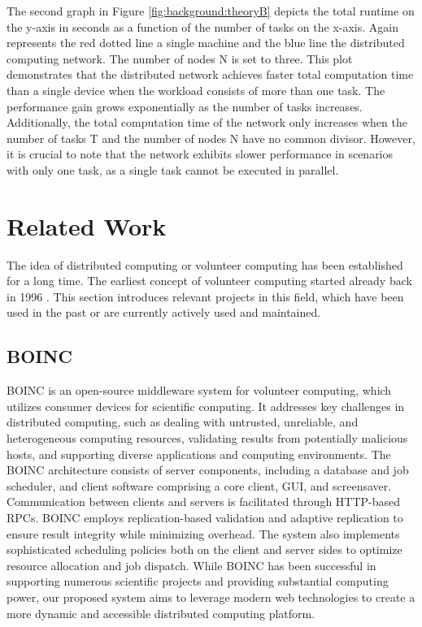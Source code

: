 The second graph in Figure \ref{fig:background:theoryB} depicts the total runtime on the y-axis in seconds as a function of the number of tasks on the x-axis. Again represents the red dotted line a single machine and the blue line the distributed computing network. The number of nodes N is set to three. This plot demonstrates that the distributed network achieves faster total computation time than a single device when the workload consists of more than one task. The performance gain grows exponentially as the number of tasks increases. Additionally, the total computation time of the network only increases when the number of tasks T and the number of nodes N have no common divisor. However, it is crucial to note that the network exhibits slower performance in scenarios with only one task, as a single task cannot be executed in parallel.

\section{Related Work}
\label{sec:background:related_work}
The idea of distributed computing or volunteer computing has been established for a long time. The earliest concept of volunteer computing started already back in 1996 \cite{relatedwork:boinc1}. This section introduces relevant projects in this field, which have been used in the past or are currently actively used and maintained.   
\subsection{BOINC}
\label{subsec:background:related_work:boinc}
\ac{BOINC} is an open-source middleware system for volunteer computing, which utilizes consumer devices for scientific computing. It addresses key challenges in distributed computing, such as dealing with untrusted, unreliable, and heterogeneous computing resources, validating results from potentially malicious hosts, and supporting diverse applications and computing environments.
The BOINC architecture consists of server components, including a database and job scheduler, and client software comprising a core client, GUI, and screensaver. Communication between clients and servers is facilitated through HTTP-based RPCs. BOINC employs replication-based validation and adaptive replication to ensure result integrity while minimizing overhead. The system also implements sophisticated scheduling policies both on the client and server sides to optimize resource allocation and job dispatch.
While BOINC has been successful in supporting numerous scientific projects and providing substantial computing power, our proposed system aims to leverage modern web technologies to create a more dynamic and accessible distributed computing platform. \cite{relatedwork:boinc1}
